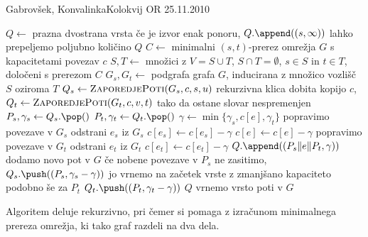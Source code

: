 \begin{naloga}{Gabrovšek, Konvalinka}{Kolokvij OR 25.11.2010}
\begin{odgovor}
\begin{enumerate}[(a)]
\begin{small}
\begin{algorithmic}
    \State $Q \gets$ prazna dvostrana vrsta
     \hfill če je izvor enak ponoru,
        \State $Q.\append((s, \infty))$ \hfill lahko prepeljemo poljubno količino
        \State \Return $Q$
    \EndIf
    \State $C \gets$
        minimalni $(s, t)$-prerez omrežja $G$ s kapacitetami povezav $c$
    \State $S, T \gets$ množici z
        $V = S \cup T$, $S \cap T = \emptyset$, $s \in S$ in $t \in T$,
        določeni s prerezom $C$
    \State $G_s, G_t \gets$ podgrafa grafa $G$,
        inducirana z množico vozlišč $S$ oziroma $T$
        \State $Q_s \gets \text{\sc{ZaporedjePoti}}(G_s, c, s, u)$
            \hfill rekurzivna klica dobita kopijo $c$,
        \State $Q_t \gets \text{\sc{ZaporedjePoti}}(G_t, c, v, t)$
            \hfill tako da ostane slovar nespremenjen
            \State $P_s, \gamma_s \gets Q_s.\pop()$
            \State $P_t, \gamma_t \gets Q_t.\pop()$
            \State $\gamma \gets \min\{\gamma_s, c[e], \gamma_t\}$
             \hfill popravimo povezave v $G_s$
                    \State odstrani $e_s$ iz $G_s$
                \Else
                    \State $c[e_s] \gets c[e_s] - \gamma$
                \EndIf
            \EndFor
            \State $c[e] \gets c[e] - \gamma$
             \hfill popravimo povezave v $G_t$
                    \State odstrani $e_t$ iz $G_t$
                \Else
                    \State $c[e_t] \gets c[e_t] - \gamma$
                \EndIf
            \EndFor
            \State $Q.\append((P_s \| e \| P_t, \gamma))$
                \hfill dodamo novo pot v $G$
                    \hfill če nobene povezave v $P_s$ ne zasitimo,
                \State $Q_s.\push((P_s, \gamma_s - \gamma))$
                    \hfill jo vrnemo na začetek vrste
            \EndIf \hfill z zmanjšano kapaciteto
             \hfill podobno še za $P_t$
                \State $Q_t.\push((P_t, \gamma_t - \gamma))$
            \EndIf
        \EndWhile
    \EndFor
    \State \Return $Q$ \hfill vrnemo vrsto poti v $G$
\EndFunction
\end{algorithmic}
\end{small}
Algoritem deluje rekurzivno,
pri čemer si pomaga z izračunom minimalnega prereza omrežja,
ki tako graf razdeli na dva dela.

\end{enumerate}
\end{odgovor}
\end{naloga}
